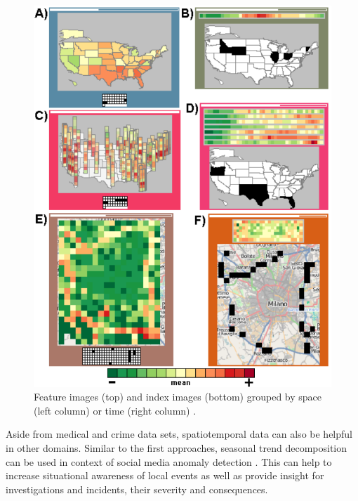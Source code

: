 \documentclass[electronic]{vgtc}             %
\begin{document}
\begin{figure}[htb]
	\centering
	\includegraphics[width=\columnwidth]{SOM}
	\caption{Feature images (top) and index images (bottom) grouped by space (left column) or time (right column)  \cite{Andrienko:2010:Space}.
	}
	\label{fig:som}
\end{figure}

Aside from medical and crime data sets, spatiotemporal data can also be helpful in other domains. 
Similar to the first approaches, seasonal trend decomposition can be used in context of social media anomaly detection \cite{Chae:2012, Thom:2012}. 
This can help to increase situational awareness of local events as well as provide insight for investigations and incidents, their severity and consequences.
\end{document}
